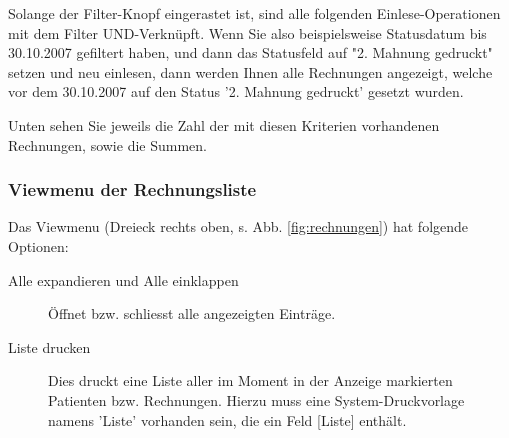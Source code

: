 Solange der Filter-Knopf eingerastet ist, sind alle folgenden Einlese-Operationen mit dem Filter UND-Verknüpft. Wenn Sie also beispielsweise Statusdatum bis 30.10.2007 gefiltert haben, und dann das Statusfeld auf "2. Mahnung gedruckt" setzen und neu einlesen, dann werden Ihnen alle Rechnungen angezeigt, welche vor dem 30.10.2007 auf den Status '2. Mahnung gedruckt' gesetzt wurden.

Unten sehen Sie jeweils die Zahl der mit diesen Kriterien vorhandenen Rechnungen, sowie die Summen.
\subsubsection{Viewmenu der Rechnungsliste}
Das Viewmenu (Dreieck rechts oben, s. Abb. \ref{fig:rechnungen}) hat folgende Optionen:
\begin{description}
\item [Alle expandieren und Alle einklappen] Öffnet bzw. schliesst alle angezeigten Einträge.
\item [Liste drucken] Dies druckt eine Liste aller im Moment in der Anzeige markierten Patienten bzw. Rechnungen. Hierzu muss eine System-Druckvorlage namens 'Liste' vorhanden sein, die ein Feld [Liste] enthält.
\end{description}
